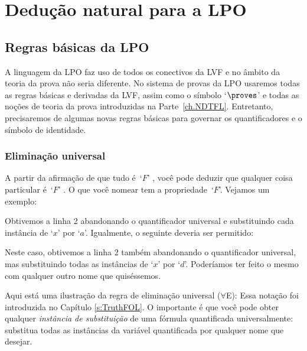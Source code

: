 \part{Dedu\c c\~ao natural para a LPO}
\label{ch.NDFOL}

 
\chapter{Regras b\'asicas da LPO}\label{s:BasicFOL}

A linguagem da LPO faz uso de todos os conectivos da LVF  e no \^ambito da teoria da prova n\~ao seria diferente.  No sistema de provas da LPO usaremos todas  as regras b\'asicas e derivadas da LVF,  assim como o s\'imbolo `$\proves$' e todas as no\c c\~oes de teoria da prova introduzidas  na Parte~\ref{ch.NDTFL}.  Entretanto,  precisaremos de algumas novas regras b\'asicas para governar os quantificadores e o s\'imbolo de identidade. 

 
\section{Elimina\c c\~ao universal}

A partir da afirma\c c\~ao de que tudo \'e~`$F$' , voc\^e pode deduzir que qualquer coisa particular \'e~`$F$' . O que voc\^e nomear tem a propriedade~`$F$'.   Vejamos um exemplo:
\begin{fitchproof}
	 
\end{fitchproof}
 Obtivemos a linha 2 abandonando  o quantificador universal e substituindo cada inst\^ancia de `$x$'  por `$a$'.  Igualmente, o seguinte deveria ser permitido:
\begin{fitchproof}
	 
\end{fitchproof}

 
Neste caso, obtivemos a linha  2 tamb\'em abandonando o quantificador universal, mas substituindo todas as inst\^ancias de  `$x$' por  `$d$'. Poder\'iamos ter feito o mesmo com qualquer outro nome que quis\'essemos.

Aqui est\'a uma ilustra\c c\~ao da regra de elimina\c c\~ao universal ($\forall$E):
Essa nota\c c\~ao foi introduzida no Capítulo  \ref{s:TruthFOL}. O importante \'e que voc\^e pode obter qualquer \emph{inst\^ancia de substitui\c c\~ao} de uma f\'ormula quantificada universalmente: substitua todas as inst\^ancias da vari\'avel quantificada por qualquer nome que desejar. 

